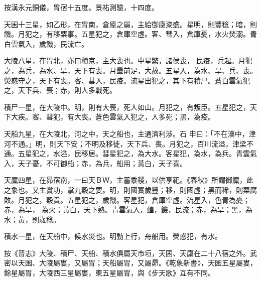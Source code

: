 \begin{pinyinscope}
 按漢永元銅儀，胃宿十五度。景祐測驗，十四度。



 天囷十三星，如乙形，在胃南，倉廩之屬，主給御廩粢盛。星明，則豐稔；暗，則饑。月犯之，有移粟事。五星犯之，倉庫空虛。客、彗入，倉庫憂，水火焚溺。青白雲氣入，歲饑，民流亡。



 大陵八星，在胃北，亦曰積京，主大喪也。中星繁，諸侯喪，
 民疫，兵起。月犯之，為兵，為水、旱，天下有喪。月暈前足，大赦。五星入，為水、旱、兵、喪。熒惑守之，天下有喪。客、彗入，民疫。流星出犯之，其下有積尸。蒼白雲氣犯之，天下兵、喪；赤，則人多戰死。



 積尸一星，在大陵中。明，則有大喪，死人如山。月犯之，有叛臣。五星犯之，天下大疾。客、彗犯，有大喪。蒼色雲氣入犯之，人多死；黑，為疫。



 天船九星，在大陵北，河之中，天之船也，主通濟利涉。石
 申曰：「不在漢中，津河不通。」明，則天下安；不明及移徙，天下兵、喪。月犯之，百川流溢，津梁不通。五星犯之，水溢，民移居。彗星犯之，為大水。客星犯，為水，為兵。青雲氣入，天子憂，不可御船；赤，為兵，船用；黃白，天子喜。



 天廩四星，在昴宿南，一曰天ＢＷ，主蓄黍稷，以供享祀。《春秋》所謂御廩，此之象也。又主賞功，掌九穀之要。明，則國實歲豐；移，則國虛；黑而稀，則粟腐敗。月犯之，穀貴。五星犯之，歲饑。客星犯，倉庫空虛。流星入，色青為憂；赤，為旱，
 為火；黃白，天下熟。青雲氣入，蝗，饑，民流；赤，為旱；黑，為水；黃，則歲稔。



 積水一星，在天船中，候水災也。明動上行，舟船用。熒惑犯，有水。



 按《晉志》大陵、積尸、天船、積水俱屬天市垣，天囷、天廩在二十八宿之外。武密以天囷、大陵屬婁，又屬胃；天船屬胃，又屬昴。《乾象新書》，天囷五星屬婁，餘星屬胃，大陵西三星屬婁，東五星屬胃，與《步天歌》互有不同。



\end{pinyinscope}
